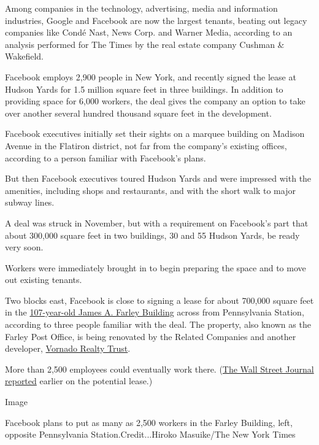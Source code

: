 Among companies in the technology, advertising, media and information
industries, Google and Facebook are now the largest tenants, beating out
legacy companies like Condé Nast, News Corp. and Warner Media, according
to an analysis performed for The Times by the real estate company
Cushman \& Wakefield.

Facebook employs 2,900 people in New York, and recently signed the lease
at Hudson Yards for 1.5 million square feet in three buildings. In
addition to providing space for 6,000 workers, the deal gives the
company an option to take over another several hundred thousand square
feet in the development.

Facebook executives initially set their sights on a marquee building on
Madison Avenue in the Flatiron district, not far from the company's
existing offices, according to a person familiar with Facebook's plans.

But then Facebook executives toured Hudson Yards and were impressed with
the amenities, including shops and restaurants, and with the short walk
to major subway lines.

A deal was struck in November, but with a requirement on Facebook's part
that about 300,000 square feet in two buildings, 30 and 55 Hudson Yards,
be ready very soon.

Workers were immediately brought in to begin preparing the space and to
move out existing tenants.

Two blocks east, Facebook is close to signing a lease for about 700,000
square feet in the
\href{https://www.nytimes.com/2017/08/17/nyregion/manhattans-farley-post-office-will-soon-be-a-grand-train-hall.html}{107-year-old
James A. Farley Building} across from Pennsylvania Station, according to
three people familiar with the deal. The property, also known as the
Farley Post Office, is being renovated by the Related Companies and
another developer,
\href{https://www.vno.com/office/property/the-farley-building/3313609/landing}{Vornado
Realty Trust}.

More than 2,500 employees could eventually work there.
(\href{https://www.wsj.com/articles/facebook-in-talks-for-new-york-office-in-deal-making-company-one-of-citys-largest-11575628203?mod=article_inline}{The
Wall Street Journal reported} earlier on the potential lease.)

Image

Facebook plans to put as many as 2,500 workers in the Farley Building,
left, opposite Pennsylvania Station.Credit...Hiroko Masuike/The New York
Times

